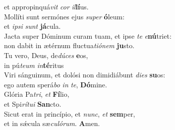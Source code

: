 \oddverse et appropinquá\textit{vit} \textit{cor} \textit{il}\textbf{lí}us.\\
\evenverse Mollíti sunt sermónes ejus \textit{su}\textit{per} \textbf{ó}leum:~\*\\
\evenverse et \textit{i}\textit{psi} \textit{sunt} \textbf{já}cula.\\
\oddverse Jacta super Dóminum curam tuam, et ipse \textit{te} \textit{e}\textbf{nú}triet:~\*\\
\oddverse non dabit in ætérnum fluctua\textit{ti}\textit{ó}\textit{nem} \textbf{ju}sto.\\
\evenverse Tu vero, Deus, de\textit{dú}\textit{ces} \textbf{e}os,~\*\\
\evenverse in pú\textit{te}\textit{um} \textit{in}\textbf{té}ritus\\
\oddverse Viri sánguinum, et dolósi non dimidiábunt \textit{di}\textit{es} \textbf{su}os:~\*\\
\oddverse ego autem sperá\textit{bo} \textit{in} \textit{te}, \textbf{Dó}mine.\\
\evenverse Glória Pa\textit{tri}, \textit{et} \textbf{Fí}lio,~\*\\
\evenverse et Spi\textit{rí}\textit{tu}\textit{i} \textbf{San}cto.\\
\oddverse Sicut erat in princípio, et \textit{nunc}, \textit{et} \textbf{sem}per,~\*\\
\oddverse et in sǽcula sæ\textit{cu}\textit{ló}\textit{rum}. \textbf{A}men.\\
